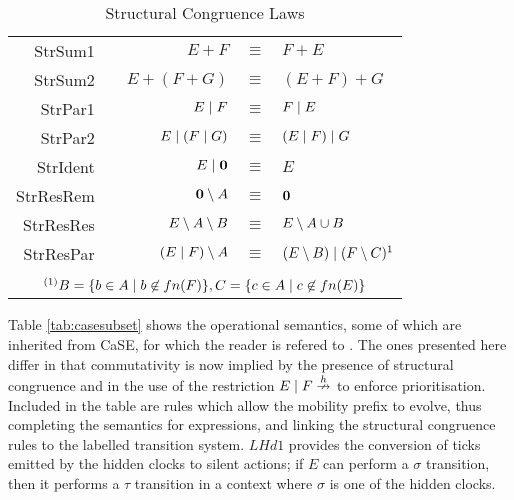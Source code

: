 \documentclass[orivec,envcountsame]{llncs}
\begin{document}
\begin{table}
 \caption{Structural Congruence Laws}
 \label{tab:structcong}
 \vspace{-3mm}
  \shrule \centering
  \begin{tabular}{rcrcl}
  StrSum1 & \quad\quad &  
  $E + F$              & $\equiv$ & $F + E$
\\
  StrSum2 &&  
  $E + (F + G)$        & $\equiv$ & $(E + F) + G$
\\
  StrPar1 &&  
  $E \mid F$            & $\equiv$ & $F \mid E$
\\
  StrPar2 &&  
  $E \mid (F \mid G)$    & $\equiv$ & $(E \mid F) \mid G$
\\
  StrIdent &&  
  $E \mid \textbf{0}$         & $\equiv$ & $E$
\\
  StrResRem &&  
  $\textbf{0} \setminus {A}$       & $\equiv$ & $\textbf{0}$
\\
  StrResRes &&  
  $E \setminus {A} \setminus {B}$  & $\equiv$ & $E \setminus {A \cup B}$
\\
  StrResPar &&  
  $(E \mid F) \setminus {A}$  & $\equiv$ & $(E \setminus {B}) \mid (F \setminus {C})^1$
\\
\\
 \multicolumn{5}{c}{$
   {}^{(1)}  B = \{b \in A \mid b \not \in fn(F)\},
              C = \{c \in A \mid c \not \in fn(E)\}
  $}
  \end{tabular}
  \shrule
\end{table}

Table \ref{tab:casesubset} shows the operational semantics, some of
which are inherited from CaSE, for which the reader is refered to
\cite{case}.  The ones presented here differ in that commutativity is
now implied by the presence of structural congruence and in the use of
the restriction $E \;|\; F \stackrel{h}{\nrightarrow}$ to enforce prioritisation.
Included in the table are rules which allow the mobility prefix to
evolve, thus completing the semantics for expressions, and linking the
structural congruence rules to the labelled transition system.  $LHd1$
provides the conversion of ticks emitted by the hidden clocks to silent
actions; if $E$ can perform a $\sigma$ transition, then it performs a
$\tau$ transition in a context where $\sigma$ is one of the hidden
clocks.
\end{document}
